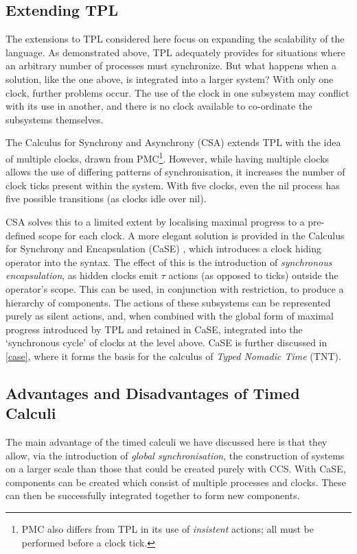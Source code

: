 \subsection{Extending TPL}
\label{tplext}

The extensions to TPL considered here focus on expanding the
scalability of the language.  As demonstrated above, TPL adequately
provides for situations where an arbitrary number of processes must
synchronize.  But what happens when a solution, like the one above, is
integrated into a larger system?  With only one clock, further
problems occur.  The use of the clock in one subsystem may conflict
with its use in another, and there is no clock available to
co-ordinate the subsystems themselves.

The Calculus for Synchrony and Asynchrony (CSA) \cite{csa} extends TPL
with the idea of multiple clocks, drawn from PMC\footnote{PMC also
  differs from TPL in its use of \emph{insistent} actions; all must be
  performed before a clock tick.}\cite{pmc}. However, while having
multiple clocks allows the use of differing patterns of
synchronisation, it increases the number of clock ticks present within
the system.  With five clocks, even the nil process has five possible
transitions (as clocks idle over nil).

CSA solves this to a limited extent by localising maximal progress to
a pre-defined scope for each clock.  A more elegant solution is
provided in the Calculus for Synchrony and Encapsulation (CaSE)
\cite{CaSE}, which introduces a clock hiding operator into the syntax.
The effect of this is the introduction of \emph{synchronous
  encapsulation}, as hidden clocks emit $\tau$ actions (as opposed to
ticks) outside the operator's scope.  This can be used, in conjunction
with restriction, to produce a hierarchy of components.  The actions
of these subsystems can be represented purely as silent actions, and,
when combined with the global form of maximal progress introduced by
TPL and retained in CaSE, integrated into the `synchronous cycle'
\cite{CaSE} of clocks at the level above.  CaSE is further discussed
in \ref{case}, where it forms the basis for the calculus of
\emph{Typed Nomadic Time} (TNT).

\subsection{Advantages and Disadvantages of Timed Calculi}
\label{timelimit}

The main advantage of the timed calculi we have discussed here is that
they allow, via the introduction of \emph{global synchronisation}, the
construction of systems on a larger scale than those that could be
created purely with CCS.  With CaSE, components can be created which
consist of multiple processes and clocks.  These can then be
successfully integrated together to form new components.

